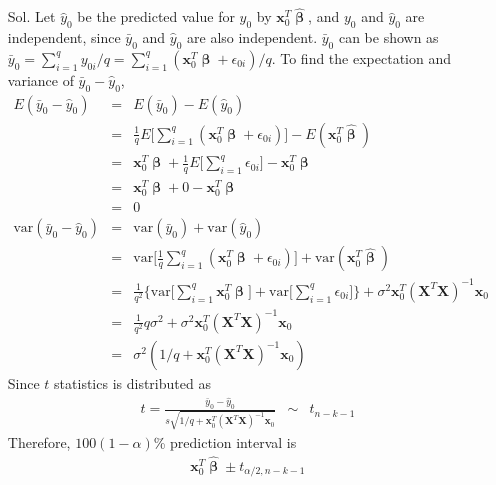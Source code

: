 \documentclass[12pt]{article} %
\begin{document}
\begin{enumerate}
	\begin{itemize}
	 \item[Sol.] Let $\hat{y}_{0}$ be the predicted value for $y_{0}$ by $\mathbf{x}_{0}^{T}\hat{\pmb{\upbeta}}$,  
	 and $y_{0}$ and $\hat{y}_{0}$ are independent, since $\bar{y}_{0}$ and $\hat{y}_{0}$ are also independent. 
	 $\bar{y}_{0}$ can be shown as 
	 $\bar{y}_{0}=\sum_{i=1}^{q}y_{0i}/q=\sum_{i=1}^{q}(\mathbf{x}_{0}^{T}\pmb{\upbeta}+\epsilon_{0i})/q$. 
	 To find the expectation and variance of $\bar{y}_{0}-\hat{y}_{0}$, 	  
	 \begin{eqnarray*}
	  E(\bar{y}_{0}-\hat{y}_{0})&=&E(\bar{y}_{0})-E(\hat{y}_{0})\\
	  &=&
	  \frac{1}{q}E \big [\sum_{i=1}^{q}(\mathbf{x}_{0}^{T}\pmb{\upbeta}+\epsilon_{0i})
	  \big ]-E(\mathbf{x}_{0}^{T}\hat{\pmb{\upbeta}})\\
	  &=&
	  \mathbf{x}_{0}^{T}\pmb{\upbeta}+\frac{1}{q}E \big [\sum_{i=1}^{q}\epsilon_{0i}\big ]-\mathbf{x}_{0}^{T}\pmb{\upbeta}\\
	  &=&
	  \mathbf{x}_{0}^{T}\pmb{\upbeta}+0-\mathbf{x}_{0}^{T}\pmb{\upbeta}\\
	  &=& 0 \\
	  \mathrm{var}(\bar{y}_{0}-\hat{y}_{0}) &=& \mathrm{var}(\bar{y}_{0})+ \mathrm{var}(\hat{y}_{0}) \\
	  &=&
	  \mathrm{var}\big [\frac{1}{q}\sum_{i=1}^{q}(\mathbf{x}_{0}^{T}\pmb{\upbeta}+\epsilon_{0i}) \big ]
	  +\mathrm{var}(\mathbf{x}_{0}^{T}\hat{\pmb{\upbeta}})\\
	  &=&
	  \frac{1}{q^{2}}\Big\{\mathrm{var}\big [\sum_{i=1}^{q}\mathbf{x}_{0}^{T}\pmb{\upbeta}
	  \big ]+\mathrm{var}\big [\sum_{i=1}^{q}\epsilon_{0i} \big ] \Big\}
	  +\sigma^{2}\mathbf{x}_{0}^{T}(\mathbf{X}^{T}\mathbf{X})^{-1}\mathbf{x}_{0}\\
	  &=&
	  \frac{1}{q^{2}}q\sigma^{2}+\sigma^{2}\mathbf{x}_{0}^{T}(\mathbf{X}^{T}\mathbf{X})^{-1}\mathbf{x}_{0}\\
	  &=&
	  \sigma^{2}(1/q+\mathbf{x}_{0}^{T}(\mathbf{X}^{T}\mathbf{X})^{-1}\mathbf{x}_{0})
	 \end{eqnarray*}
	 Since $t$ statistics is distributed as 
	 \begin{eqnarray*}
	  t=\frac{\bar{y}_{0}-\hat{y}_{0}}{s\sqrt{1/q+\mathbf{x}_{0}^{T}(\mathbf{X}^{T}\mathbf{X})^{-1}\mathbf{x}_{0}}}
	  &\sim & t_{n-k-1}
	 \end{eqnarray*}
	 Therefore, $100(1-\alpha)$\% prediction interval is
	 \begin{eqnarray*}
	  \mathbf{x}_{0}^{T}\hat{\pmb{\upbeta}}\pm t_{\alpha /2,n-k-1}

\end{eqnarray*}
\end{itemize}
\end{enumerate}
\end{document}
